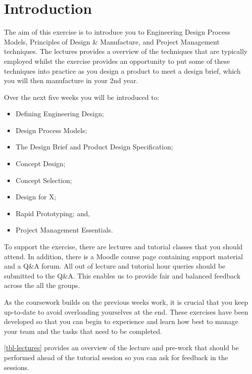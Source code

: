 \section{Introduction}

The aim of this exercise is to introduce you to Engineering Design Process Models, Principles of Design \& Manufacture, and Project Management techniques. 
The lectures provides a overview of the techniques that are typically employed whilst the exercise provides an opportunity to put some of these techniques into practice as you design a product to meet a design brief, which you will then manufacture in your 2nd year.

Over the next five weeks you will be introduced to:

\begin{itemize}
  \item Defining Engineering Design;
  \item Design Process Models;
  \item The Design Brief and Product Design Specification;
  \item Concept Design;
  \item Concept Selection;
  \item Design for X;
  \item Rapid Prototyping; and,
  \item Project Management Essentials.
\end{itemize}

 To support the exercise, there are lectures and tutorial classes that you should attend. 
In addition, there is a Moodle course page containing support material and a Q\&A forum. 
All out of lecture and tutorial hour queries should be submitted to the Q\&A. 
This enables us to provide fair and balanced feedback across the all the groups.

As the coursework builds on the previous weeks work, it is crucial that you keep up-to-date to avoid overloading yourselves at the end. These exercises have been developed so that you can begin to experience and learn how best to manage your team and the tasks that need to be completed.

\cref{tbl-lectures} provides an overview of the lecture and pre-work that should be performed ahead of the tutorial session so you can ask for feedback in the sessions.

